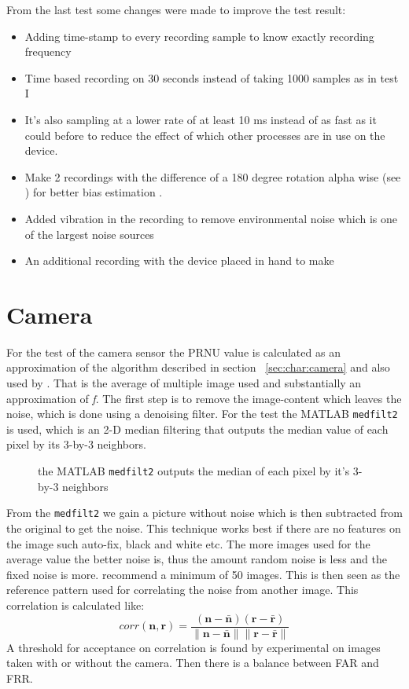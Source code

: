 From the last test some changes were made to improve the test result:
\begin{itemize}
  \item Adding time-stamp to every recording sample to know exactly recording frequency
  \item Time based recording on 30 seconds instead of taking 1000 samples as in test I
  \item It's also sampling at a lower rate of at least 10 ms instead of as fast as it could before to reduce the effect of which other processes are in use on the device.
  \item Make 2 recordings with the difference of a 180 degree rotation alpha wise (see ) for better bias estimation \cite{acc:kionixerr}.
  \item Added vibration in the recording to remove environmental noise which is one of the largest noise sources ~\cite[p.8]{acc:kionixerr} 
  \item An additional recording with the device placed in hand to make 
\end{itemize}

\section{Camera}\label{sec:test:camera}
For the test of the camera sensor the PRNU value is calculated as an approximation of the algorithm described in section ~\ref{sec:char:camera} and also used by \cite{sensor:camera:DCIdent}. That is the average of multiple image used and substantially an approximation of \textit{f}. The first step is to remove the image-content which leaves the noise, which is done using a denoising filter. For the test the MATLAB \texttt{medfilt2} is used, which is an 2-D median filtering that outputs the median value of each pixel by its 3-by-3 neighbors. 
\begin{figure}[H]
  \centering
  
  \caption{\label{fig:medfilt2} the MATLAB \texttt{medfilt2} outputs the median of each pixel by it's 3-by-3 neighbors}
\end{figure}
From the \texttt{medfilt2} we gain a picture without noise which is then subtracted from the original to get the noise. This technique works best if there are no features on the image such auto-fix, black and white etc. The more images used for the average value the better noise is, thus the amount random noise is less and the fixed noise is more. \cite{sensor:camera:DCIdent} recommend a minimum of 50 images. This is then seen as the reference pattern used for correlating the noise from another image. This correlation is calculated like:
$$
corr(\boldsymbol{n},\boldsymbol{r}) = 
\frac{(\boldsymbol{n} - \bar{\boldsymbol{n}})(\boldsymbol{r} - \bar{\boldsymbol{r}})}
{\|\boldsymbol{n} - \bar{\boldsymbol{n}}\| \|\boldsymbol{r} - \bar{\boldsymbol{r}}\|}
$$
A threshold for acceptance on correlation is found by experimental on images taken with or without the camera. Then there is a balance between FAR and FRR. 

